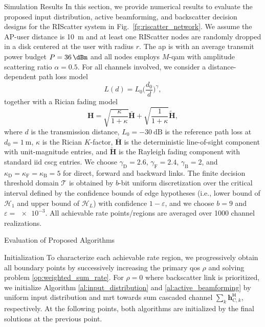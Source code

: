 \documentclass[journal]{IEEEtran}
\begin{document}
\begin{section}{Simulation Results}
	In this section, we provide numerical results to evaluate the proposed input distribution, active beamforming, and backscatter decision designs for the RIScatter system in Fig.~\ref{fg:riscatter_network}.
	We assume the AP-user distance is \qty{10}{\meter} and at least one RIScatter nodes are randomly dropped in a disk centered at the user with radius $r$.
	The \gls{ap} is with an average transmit power budget $P=\qty{36}{\dBm}$ and all nodes employs $M$-\gls{qam} with amplitude scattering ratio $\alpha=0.5$.
	For all channels involved, we consider a distance-dependent path loss model
	\begin{equation}
		L(d) = L_0 \biggl(\frac{d_0}{d}\biggr)^\gamma,
	\end{equation}
	together with a Rician fading model
	\begin{equation}
		\boldsymbol{H} = \sqrt{\frac{\kappa}{1+\kappa}} \bar{\boldsymbol{H}} + \sqrt{\frac{1}{1+\kappa}} \tilde{\boldsymbol{H}},
	\end{equation}
	where $d$ is the transmission distance, $L_0=-\qty{30}{\dB}$ is the reference path loss at $d_0=\qty{1}{\meter}$, $\kappa$ is the Rician $K$-factor, $\bar{\boldsymbol{H}}$ is the deterministic line-of-sight component with unit-magnitude entries, and $\tilde{\boldsymbol{H}}$ is the Rayleigh fading component with standard \gls{iid} \gls{cscg} entries.
	We choose $\gamma_{\text{D}}=2.6$, $\gamma_{\text{F}}=2.4$, $\gamma_{\text{B}}=2$, and $\kappa_{\text{D}}=\kappa_{\text{F}}=\kappa_{\text{B}}=5$ for direct, forward and backward links.
	The finite decision threshold domain $\mathcal{T}$ is obtained by $b$-bit uniform discretization over the critical interval defined by the confidence bounds of edge hypotheses (i.e., lower bound of $\mathcal{H}_1$ and upper bound of $\mathcal{H}_L$) with confidence $1-\varepsilon$, and we choose $b=9$ and $\varepsilon=\num{e-3}$.
	All achievable rate points/regions are averaged over \num{1000} channel realizations.

	\begin{subsection}{Evaluation of Proposed Algorithms}
		\begin{subsubsection}{Initialization}
			To characterize each achievable rate region, we progressively obtain all boundary points by successively increasing the primary \gls{qos} $\rho$ and solving problem \eqref{op:weighted_sum_rate}.
			For $\rho=0$ where backscatter link is prioritized, we initialize Algorithm \ref{al:input_distribution} and \ref{al:active_beamforming} by uniform input distribution and \gls{mrt} towards sum cascaded channel $\sum_{k} \boldsymbol{h}_{\text{C},k}^\mathsf{H}$, respectively.
			At the following points, both algorithms are initialized by the final solutions at the previous point.
		\end{subsubsection}


\end{subsection}
\end{section}
\end{document}
